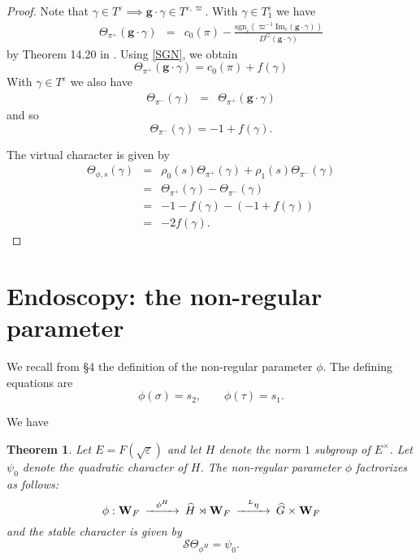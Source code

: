 \documentclass[11pt]{amsart}
\numberwithin{equation}{section}
\newtheorem{thm}[equation]{Theorem}
\def\g{\mathbf{g}}
\def\sgn{\mathrm{sgn}}
\def\bW{\mathbf{W}}
\def\W{\mathbf{W}}
\def\g{\mathbf{g}}
\newcommand{\<}{\left\langle}
\renewcommand{\>}{\right\rangle}
\begin{document}
\begin{proof}
Note that $\gamma \in T^\varepsilon \implies \g \cdot \gamma \in T^{\varepsilon, \varpi}$.   
With $\gamma \in T_1^{\varepsilon}$ we have
\begin{eqnarray*}
\Theta_{\pi^+}(\g \cdot \gamma) &=& c_0(\pi) - \frac{\sgn_{\varepsilon}(\varpi^{-1} \mathrm{Im}_\varepsilon(
\g \cdot \gamma))}{D^G(\g \cdot \gamma)}
\end{eqnarray*}
by Theorem 14.20 in \cite{ADSS}.   Using \ref{SGN}, we obtain
\[
\Theta_{\pi^+}(\g \cdot \gamma) = c_0(\pi) + f(\gamma)
\]
With $\gamma \in T^\varepsilon$ we also have
\begin{eqnarray*}
\Theta_{\pi^-}(\gamma)
&=& \Theta_{\pi^+}(\g \cdot \gamma)
\end{eqnarray*}
and so
\[
\Theta_{\pi^-}(\gamma) = -1 + f(\gamma).
\]

The virtual character is given by 
\begin{eqnarray*}
\Theta_{\phi, s}(\gamma) &=& \rho_0(s)\Theta_{\pi^+} (\gamma) + \rho_1(s)\Theta_{\pi^-}(\gamma) \\
&=& \Theta_{\pi^+}(\gamma) - \Theta_{\pi^-}(\gamma)\\
&=& -1 - f(\gamma) - (-1 + f(\gamma))\\
&=& -2f(\gamma) .
\end{eqnarray*}
\end{proof}


 
 
  \section{Endoscopy: the non-regular parameter}  We recall from \S4 the definition of the non-regular parameter $\phi$.   The defining equations are
  \[
  \phi(\sigma) = s_2, \quad \quad \phi(\tau) = s_1.
  \]
  
  We have     
   \begin{thm}  Let $E = F(\sqrt \varepsilon)$ and let $H$ denote the norm $1$ subgroup of $E^\times$.   Let $\psi_0$ denote the quadratic character of $H$.   The non-regular parameter  $\phi$  factrorizes as follows:
     \[
  \begin{CD}
 \phi :  \bW_F @> \phi^H >> \widehat{H}  \rtimes \bW_F    @> {}^L\eta >> \widehat{G} \times \W_F
  \end{CD}
  \]
and the stable character is given by     
     \[
     \mathscr{S}\Theta_{\phi^H} = \psi_0.
     \]
      \end{thm}
      
\end{document}
